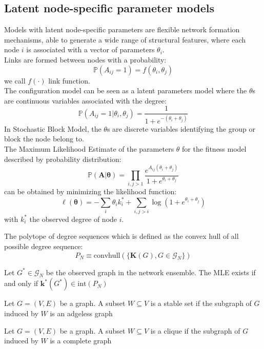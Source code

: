\subsection{Latent node-specific parameter models}
Models with latent node-specific parameters are flexible network formation mechanisms, able to generate a wide range of structural features, where each node $i$ is associated with a vector of parameters $\theta_i$.\\
Links are formed between nodes with a probability:
\[
\mathbb{P}(A_{ij} = 1) = f(\theta_i,\theta_j)
\]
we call $f(\cdot)$ link function.\\
The configuration model can be seen as a latent parameters model where the $\theta$s are continuous variables associated with the degree:
\[
\mathbb{P}(A_{ij}= 1| \theta_i,\theta_j) = \frac{1}{1 + e^{-(\theta_i + \theta_j)}}
\] 
In Stochastic Block Model, the $\theta$s are discrete variables identifying the group or block the node belong to.\\
The Maximum Likelihood Estimate of the parameters $\theta$ for the fitness model described by probability distribution:
\[
\mathbb{P}(\mathbf{A}|\mathbf{\theta}) = \prod_{i,j>1}\frac{e^{A_{ij}(\theta_i + \theta_j)}}{1 + e^{\theta_i + \theta_j}}
\]
can be obtained by minimizing the likelihood function:
\[
\ell (\mathbf{\theta}) = - \sum_i \theta_ik_i^* + \sum_{i,j>i} \log \left(1 + e^{\theta_i + \theta_j}\right)
\]
with $k^*_i$ the observed degree of node $i$.\\
\begin{mydefinition}
	The polytope of degree sequences which is defined as the convex hull of all possible degree sequence:
	\[
	P_N \equiv \text{convhull} (\{\mathbf{K}(G), G \in \mathcal{G}_N\})
	\]
\end{mydefinition}
\begin{mytheorem}
	Let $G^\ast \in \mathcal{G}_N$ be the observed graph in the network ensemble. The MLE exists if and only if $\mathbf{k}^\ast(G^\ast) \in \text{int}(P_N)$ 
\end{mytheorem}
\begin{mydefinition}
	Let $G = (V,E)$ be a graph. A subset $W\subseteq V$ is a stable set if the subgraph of $G$ induced by $W$ is an adgeless graph
\end{mydefinition}
\begin{mydefinition}[Clique]
	Let $G = (V,E)$ be a graph. A subset $W\subseteq V$ is a clique if the subgraph of $G$ induced by $W$ is a complete graph
\end{mydefinition}
